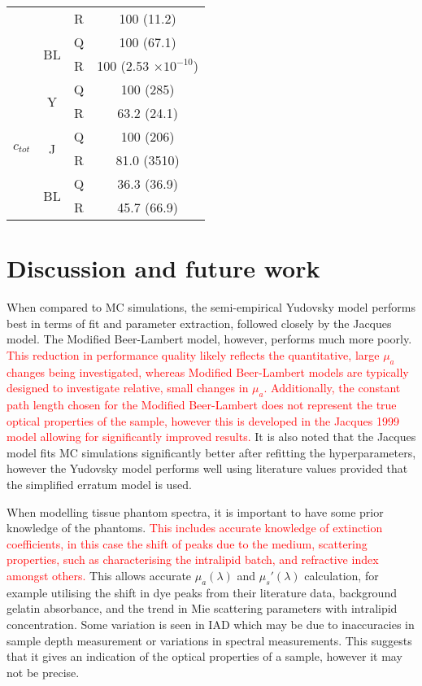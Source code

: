 \begin{table}[htb!]
\begin{tabular}{|ccc|c|}
        & & R & 100 (11.2) \\
        \cline{2-4}
        & \multirow{2}{*}{BL} & Q & 100 (67.1) \\
        & & R & 100 (2.53 $\times 10^{-10}$) \\
        \hline
        \multirow{6}{*}{$c_{tot}$} & \multirow{2}{*}{Y} & Q & 100 (285) \\
        & & R & 63.2 (24.1) \\
        \cline{2-4}
        & \multirow{2}{*}{J} & Q & 100 (206) \\
        & & R & 81.0 (3510) \\
        \cline{2-4}
        & \multirow{2}{*}{BL} & Q & 36.3 (36.9) \\
        & & R & 45.7 (66.9) \\
        \hline
    \end{tabular}
    \label{tb:3phantomparams}
\end{table}

\FloatBarrier
\section{Discussion and future work}\label{sec:discussion}
When compared to MC simulations, the semi-empirical Yudovsky model performs best in terms of fit and parameter extraction, followed closely by the Jacques model. The Modified Beer-Lambert model, however, performs much more poorly. \textcolor{red}{This reduction in performance quality likely reflects the quantitative, large $\mu_a$ changes being investigated, whereas Modified Beer-Lambert models are typically designed to investigate relative, small changes in $\mu_a$. Additionally, the constant path length chosen for the Modified Beer-Lambert does not represent the true optical properties of the sample, however this is developed in the Jacques 1999 model allowing for significantly improved results.} It is also noted that the Jacques model fits MC simulations significantly better after refitting the hyperparameters, however the Yudovsky model performs well using literature values provided that the simplified erratum model is used. 

When modelling tissue phantom spectra, it is important to have some prior knowledge of the phantoms. \textcolor{red}{This includes accurate knowledge of extinction coefficients, in this case the shift of peaks due to the medium, scattering properties, such as characterising the intralipid batch, and refractive index amongst others.} This allows accurate $\mu_a(\lambda)$ and $\mu_s'(\lambda)$ calculation, for example utilising the shift in dye peaks from their literature data, background gelatin absorbance, and the trend in Mie scattering parameters with intralipid concentration. Some variation is seen in IAD which may be due to inaccuracies in sample depth measurement or variations in spectral measurements. This suggests that it gives an indication of the optical properties of a sample, however it may not be precise. 

